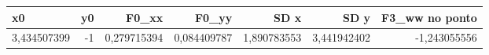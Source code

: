 \begin{tabular}{lrrrrrr}
\toprule
x0 & y0 & F0\_xx & F0\_yy & SD x & SD y & F3\_ww no ponto \\
\midrule
3,434507399 & -1 & 0,279715394 & 0,084409787 & 1,890783553 & 3,441942402 & -1,243055556 \\
\bottomrule
\end{tabular}
